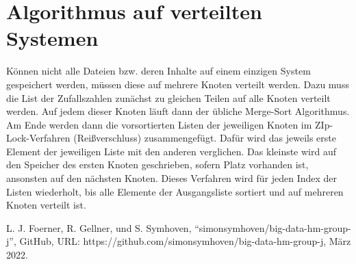 \documentclass[conference]{IEEEtran}
\begin{document}
\section{Algorithmus auf verteilten Systemen}
Können nicht alle Dateien bzw. deren Inhalte auf einem einzigen System gespeichert werden, müssen diese auf mehrere Knoten verteilt werden. Dazu muss die List der Zufallszahlen zunächst zu gleichen Teilen auf alle Knoten verteilt werden. Auf jedem dieser Knoten läuft dann der übliche Merge-Sort Algorithmus. Am Ende werden dann die vorsortierten Listen der jeweiligen Knoten im ZIp-Lock-Verfahren (Reißverschluss) zusammengefügt. Dafür wird das jeweils erste Element der jeweiligen Liste mit den anderen verglichen. Das kleinste wird auf den Speicher des ersten Knoten geschrieben, sofern Platz vorhanden ist, ansonsten auf den nächsten Knoten. Dieses Verfahren wird für jeden Index der Listen wiederholt, bis alle Elemente der Ausgangsliste sortiert und auf mehreren Knoten verteilt ist.

\begin{thebibliography}{00}
 L. J. Foerner, R. Gellner, und S. Symhoven, ``simonsymhoven/big-data-hm-group-j'', GitHub, URL: https://github.com/simonsymhoven/big-data-hm-group-j, März 2022.
\end{thebibliography}
\end{document}
